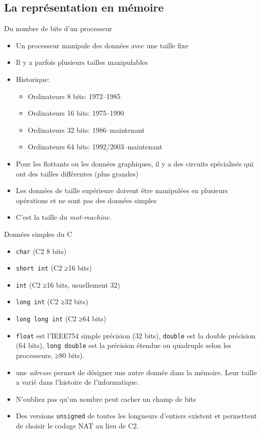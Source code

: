 \subsection{La représentation en mémoire}
\begin{frame}{Du nombre de bits d'un processeur}
  \begin{itemize}
  \item Un processeur manipule des données avec une taille fixe
  \item[\dialogwarning] Il y a parfois plusieurs tailles manipulables
  \item Historique:
    \begin{itemize}
    \item Ordinateurs 8 bits: 1972--1985
    \item Ordinateurs 16 bits: 1975--1990
    \item Ordinateurs 32 bits: 1986--maintenant
    \item Ordinateurs 64 bits: 1992/2003--maintenant
    \end{itemize}
  \item Pour les flottants ou les données graphiques, il y a des circuits
    spécialisés qui ont des tailles différentes (plus grandes)
  \item Les données de taille supérieure doivent être manipulées en plusieurs
    opérations et ne sont pas des données simples
  \item[\dialoginformation] C'est la taille du \emph{mot-machine}.
  \end{itemize}
\end{frame}
\begin{frame}{Données simples du C}
  \begin{itemize}
  \item \texttt{char} (C2 8 bits)
  \item \texttt{short int} (C2 ≥16 bits)
  \item \texttt{int} (C2 ≥16 bits, usuellement 32)
  \item \texttt{long int} (C2 ≥32 bits)
  \item \texttt{long long int} (C2 ≥64 bits)
  \item \texttt{float} est l'IEEE754 simple précision (32 bits),
    \texttt{double} est la double précision (64 bits), \texttt{long double}
    est la précision étendue ou quadruple selon les processeurs, ≥80 bits).
  \item une \emph{adresse} permet de désigner une autre donnée dans la
    mémoire. Leur taille a varié dans l'histoire de l'informatique.
  \item N'oubliez pas qu'un nombre peut cacher un champ de bits
  \item Des versions \texttt{unsigned} de toutes les longueurs d'entiers
    existent et permettent de choisir le codage NAT au lieu de C2.
  \end{itemize}
\end{frame}
